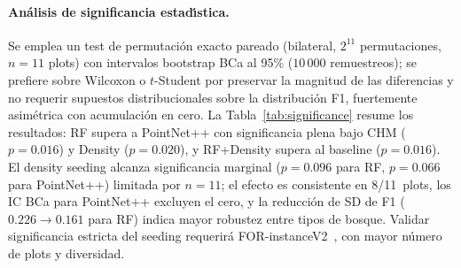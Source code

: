 \documentclass[runningheads]{llncs}
\begin{document}
\paragraph{An\'alisis de significancia estad\'\i{}stica.}
Se emplea un test de permutaci\'on exacto pareado (bilateral, $2^{11}$ permutaciones, $n=11$ plots) con intervalos bootstrap BCa al 95\% ($10\,000$ remuestreos); se prefiere sobre Wilcoxon o $t$-Student por preservar la magnitud de las diferencias y no requerir supuestos distribucionales sobre la distribuci\'on F1, fuertemente asim\'etrica con acumulaci\'on en cero. La Tabla~\ref{tab:significance} resume los resultados: RF supera a PointNet++ con significancia plena bajo CHM ($p=0.016$) y Density ($p=0.020$), y RF+Density supera al baseline ($p=0.016$). El density seeding alcanza significancia marginal ($p=0.096$ para RF, $p=0.066$ para PointNet++) limitada por $n=11$; el efecto es consistente en 8/11~plots, los IC BCa para PointNet++ excluyen el cero, y la reducci\'on de SD de F1 ($0.226 \rightarrow 0.161$ para RF) indica mayor robustez entre tipos de bosque. Validar significancia estricta del seeding requerir\'a FOR-instanceV2~\cite{xiang2025}, con mayor n\'umero de plots y diversidad.

\begin{table}[H]
\centering
\caption{Test de permutaci\'on exacto pareado (bilateral, $2^{11}$ permutaciones, $n=11$ plots) e intervalos de confianza bootstrap BCa al 95\% para diferencias en F1 de instancia.}\label{tab:significance}
\end{table}
\end{document}
